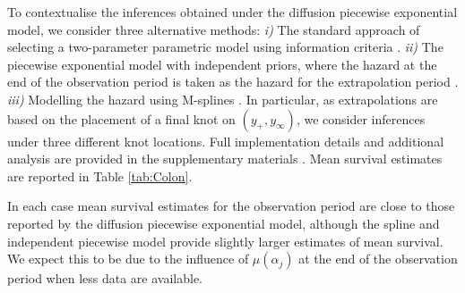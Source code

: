 \documentclass[ba,preprint]{imsart}
\theoremstyle{plain}
\theoremstyle{definition}
\theoremstyle{remark}
\begin{document}
To contextualise the inferences obtained under the diffusion piecewise exponential model, we consider three alternative methods: \textit{i)} The standard approach of selecting a two-parameter parametric model using information criteria \citep[in this case, the log-Normal parametric model;][]{Latimer2011, Baio2020}. \textit{ii)} The piecewise exponential model with independent priors, where the hazard at the end of the observation period is taken as the hazard for the extrapolation period \citep{Cooney2023a}. \textit{iii)} Modelling the hazard using M-splines \citep{Jackson2023}. In particular, as extrapolations are based on the placement of a final knot on $(y_+, y_\infty)$, we consider inferences under three different knot locations. Full implementation details and additional analysis are provided in the supplementary materials \citep[{\color{red}Section 3.3}]{Hardcastle2024supp}. Mean survival estimates are reported in Table \ref{tab:Colon}. 

In each case mean survival estimates for the observation period are close to those reported by the diffusion piecewise exponential model, although the spline and independent piecewise model provide slightly larger estimates of mean survival. We expect this to be due to the influence of $\mu(\alpha_j)$ at the end of the observation period when less data are available. 
\end{document}
